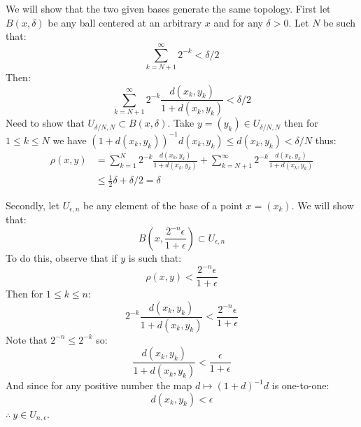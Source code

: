 We will show that the two given bases generate the same topology.
First let $B(x,\delta)$ be any ball centered at an arbitrary $x$ and for any $\delta>0$. 
Let $N$ be such that:
$$\sum_{k=N+1}^\infty 2^{-k} < \delta/2$$
Then:
$$\sum_{k=N+1}^\infty 2^{-k} \frac{d(x_k,y_k)}{1+d(x_k,y_k)}< \delta/2$$
Need to show that $U_{\delta/N,N}\subset B(x,\delta)$.
Take $y=(y_k) \in U_{\delta/N,N}$ then for $1\leq k \leq N$ we have $(1+d(x_k,y_k))^{-1}d(x_k,y_k)\leq d(x_k,y_k) < \delta/N$ thus:
\begin{align*}
\rho(x,y) &= \sum_{k=1}^N 2^{-k} \frac{d(x_k,y_k)}{1+d(x_k,y_k)} + \sum_{k=N+1}^\infty 2^{-k} \frac{d(x_k,y_k)}{1+d(x_k,y_k)} \\
          &\leq \frac 12 \delta + \delta/2 = \delta
\end{align*}

Secondly, let $U_{\epsilon, n}$ be any element of the base of a point $x=(x_k)$. We will show that:
$$B(x,\frac{2^{-n}\epsilon}{1+\epsilon}) \subset U_{\epsilon, n}$$
To do this, observe that if $y$ is such that:
$$\rho(x,y)<\frac{2^{-n}\epsilon}{1+\epsilon}$$
Then for $1\leq k \leq n$:
$$2^{-k} \frac{d(x_k,y_k)}{1+d(x_k,y_k)} < \frac{2^{-n}\epsilon}{1+\epsilon}$$
Note that $2^{-n}\leq 2^{-k}$ so:
$$ \frac{d(x_k,y_k)}{1+d(x_k,y_k)} < \frac{\epsilon}{1+\epsilon}$$
And since for any positive number the map $d\mapsto (1+d)^{-1}d$ is one-to-one:
$$d(x_k,y_k)<\epsilon$$
$\therefore \ y\in U_{n,\epsilon}$.
